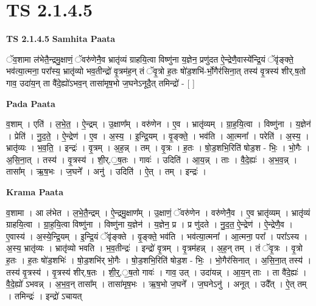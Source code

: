 \documentclass[17pt]{extarticle}
\begin{document}
\section{ TS 2.1.4.5 }

\textbf{TS 2.1.4.5 } \newline
\textbf{Samhita Paata} \newline

ॅव॒शामा ल॑भेतै॒न्द्रमु॒क्षाणं॒ ॅवरु॑णेनै॒व भ्रातृ॑व्यं ग्राहयि॒त्वा विष्णु॑ना य॒ज्ञेन॒ प्रणु॑दत ऐ॒न्द्रेणै॒वास्ये᳚न्द्रि॒यं ॅवृ॑ङ्क्ते॒ भव॑त्या॒त्मना॒ परा᳚स्य॒ भ्रातृ॑व्यो भव॒तीन्द्रो॑ वृ॒त्रम॑ह॒न् तं ॅवृ॒त्रो ह॒तः षो॑ड॒शभि॑-र्भो॒गैर॑सिना॒त् तस्य॑ वृ॒त्रस्य॑ शीर्.ष॒तो गाव॒ उदा॑य॒न् ता वै॑दे॒ह्यो॑ऽभव॒न् तासा॑मृष॒भो ज॒घनेऽनूदै॒त् तमिन्द्रो॑ - [  ] \newline

\textbf{Pada Paata} \newline

व॒शाम् । एति॑ । ल॒भे॒त॒ । ऐ॒न्द्रम् । उ॒क्षाण᳚म् । वरु॑णेन । ए॒व । भ्रातृ॑व्यम् । ग्रा॒ह॒यि॒त्वा । विष्णु॑ना । य॒ज्ञेन॑ । प्रेति॑ । नु॒द॒ते॒ । ऐ॒न्द्रेण॑ । ए॒व । अ॒स्य॒ । इ॒न्द्रि॒यम् । वृ॒ङ्क्ते॒ । भव॑ति । आ॒त्मना᳚ । परेति॑ । अ॒स्य॒ । भ्रातृ॑व्यः । भ॒व॒ति॒ । इन्द्रः॑ । वृ॒त्रम् । अ॒ह॒न्न् । तम् । वृ॒त्रः । ह॒तः । षो॒ड॒शभि॒रिति॑ षोड॒श - भिः॒ । भो॒गैः । अ॒सि॒ना॒त् । तस्य॑ । वृ॒त्रस्य॑ । शी॒र्.॒ष॒तः । गावः॑ । उदिति॑ । आ॒य॒न्न् । ताः । वै॒दे॒ह्यः॑ । अ॒भ॒व॒न्न् । तासा᳚म् । ऋ॒ष॒भः । ज॒घने᳚ । अनु॑ । उदिति॑ । ऐ॒त् । तम् । इन्द्रः॑ ।  \newline


\textbf{Krama Paata} \newline

व॒शामा । आ ल॑भेत । ल॒भे॒तै॒न्द्रम् । ऐ॒न्द्रमु॒क्षाण᳚म् । उ॒क्षाणं॒ ॅवरु॑णेन । वरु॑णेनै॒व । ए॒व भ्रातृ॑व्यम् । भ्रातृ॑व्यं ग्राहयि॒त्वा । ग्रा॒॒ह॒यि॒त्वा विष्णु॑ना । विष्णु॑ना य॒ज्ञेन॑ । य॒ज्ञेन॒ प्र । प्र णु॑दते । नु॒द॒त॒ ऐ॒न्द्रेण॑ । ऐ॒न्द्रेणै॒व । ए॒वास्य॑ । अ॒स्ये॒न्द्रि॒यम् । इ॒न्द्रि॒यं ॅवृ॑ङ्क्ते । वृ॒ङ्क्ते॒ भव॑ति । भव॑त्या॒त्मना᳚ । आ॒त्मना॒ परा᳚ । परा᳚ऽस्य । अ॒स्य॒ भ्रातृ॑व्यः । भ्रातृ॑व्यो भवति । भ॒व॒तीन्द्रः॑ । इन्द्रो॑ वृ॒त्रम् । वृ॒त्रम॑हन्न् । अ॒ह॒न् तम् । तं ॅवृ॒त्रः । वृ॒त्रो ह॒तः । ह॒तः षो॑ड॒शभिः॑ । षो॒ड॒शभि॑र् भो॒गैः । षो॒ड॒शभि॒रिति॑ षोड॒श - भिः॒ । भो॒गैर॑सिनात् । अ॒सि॒ना॒त् तस्य॑ । तस्य॑ वृ॒त्रस्य॑ । वृ॒त्रस्य॑ शीर्.ष॒तः । शी॒र्॒.॒ष॒तो गावः॑ । गाव॒ उत् । उदा॑यन्न् । आ॒य॒न् ताः । ता वै॑दे॒ह्यः॑ । वै॒दे॒ह्यो॑ ऽभवन्न् । अ॒भ॒व॒न् तासा᳚म् । तासा॑मृष॒भः । ऋ॒ष॒भो ज॒घने᳚ । ज॒घनेऽनु॑ । अनूत् । उदै᳚त् । ऐ॒त् तम् । तमिन्द्रः॑ । इन्द्रो॑ ऽचायत् \newline
\end{document}
